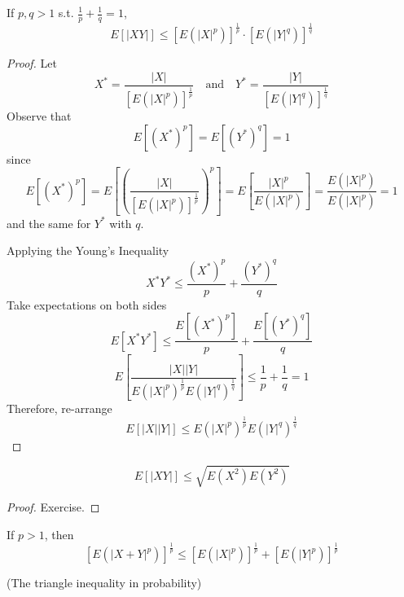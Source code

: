 \begin{reqproof}
\begin{theorem}
    If $p,q > 1$ s.t. $\frac{1}{p} + \frac{1}{q} = 1$,
    \[E[|XY|] \leq [E(|X|^p)]^{\frac{1}{p}} \cdot [E(|Y|^q)]^{\frac{1}{q}}\]

    \begin{proof}
    Let
    \[X^* = \frac{|X|}{[E(|X|^p)]^{\frac{1}{p}}} \quad \text{and} \quad Y^* = \frac{|Y|}{[E(|Y|^q)]^{\frac{1}{q}}}\]
    Observe that
    \[E[(X^*)^p] = E[(Y^*)^q] = 1\]
    since
    \[E[(X^*)^p] = E\left[\left(\frac{|X|}{[E(|X|^p)]^{\frac{1}{p}}}\right)^p\right] = E\left[\frac{|X|^p}{E(|X|^p)}\right] = \frac{E(|X|^p)}{E(|X|^p)} = 1\]
    and the same for $Y^*$ with $q$.

    Applying the Young's Inequality
    \[X^*Y^* \leq \frac{(X^*)^p}{p} + \frac{(Y^*)^q}{q}\]
    Take expectations on both sides
    \[E[X^*Y^*]\leq \frac{E[(X^*)^p]}{p} + \frac{E[(Y^*)^q]}{q}\]
    \[E\left[\frac{|X||Y|}{E(|X|^p)^{\frac{1}{p}}E(|Y|^q)^{\frac{1}{q}}}\right] \leq \frac{1}{p}+ \frac{1}{q} = 1\]
    Therefore, re-arrange
    \[E[|X||Y|] \leq E(|X|^p)^{\frac{1}{p}} E(|Y|^q)^{\frac{1}{q}}\]
    \end{proof}
\end{theorem}
\end{reqproof}

\begin{reqproof}
\begin{proposition}
    \[E[|XY|] \leq \sqrt{E(X^2)E(Y^2)}\]
    \begin{proof}
    Exercise.
    \end{proof}
\end{proposition}
\end{reqproof}

\begin{reqnoproof}
\begin{theorem}
    If $p>1$, then
    \[[E(|X+Y|^p)]^{\frac{1}{p}} \leq [E(|X|^p)]^{\frac{1}{p}} + [E(|Y|^p)]^{\frac{1}{p}}\]
    \begin{center}
        (The triangle inequality in probability)
    \end{center}
\end{theorem}
\end{reqnoproof}

{\large{}\par}
